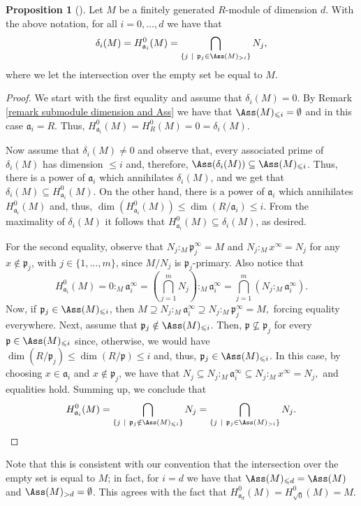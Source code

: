 \documentclass[12pt]{amsart}
\theoremstyle{definition}
\newtheorem{proposition}[theorem]{Proposition}
\theoremstyle{definition}
\def\frk{\mathfrak}               %
\def\aa{{\frk a}}
\def\pp{{\frk p}}
\renewcommand{\leq}{\leqslant}
\begin{document}
\begin{proposition}[{\cite[Proposition 2.2]{Sch99}}]\label{sche02}
  Let $M$ be a finitely generated $R$-module of dimension $d$. With the above notation, for all $i=0,\ldots,d$ we have that
 \[
 \delta_i(M) = H^0_{\aa_i}(M)=\bigcap\limits_{\{j \ \mid \ \pp_j\in\Ass(M)_{> i}\}} N_j,
 \]
 where we let the intersection over the empty set  be equal to $M$.
\end{proposition}
\begin{proof}
We start with the first equality and assume that $\delta_i(M)=0$. By Remark \ref{remark submodule dimension and Ass} we have that $\Ass(M)_{\leq i} = \emptyset$ and in this case  $\aa_i = R$. Thus,  $H^0_{\aa_i}(M) = H^0_R(M) = 0 = \delta_i(M)$.

\noindent
Now assume that $\delta_i(M) \ne 0$ and observe that,  every associated prime of $\delta_i(M)$ has dimension $\leq i$ and, therefore, $\Ass(\delta_i(M)) \subseteq \Ass(M)_{\leq i}$. Thus, there is a power of $\aa_i$ which annihilates $\delta_i(M)$, and we get that $\delta_i(M) \subseteq H^0_{\aa_i}(M)$. On the other hand, there is a power of $\aa_i$ which annihilates $H^0_{\aa_i}(M)$ and, thus, $\dim(H^0_{\aa_i}(M)) \leq \dim(R/\aa_i) \leq i$. From the maximality of $\delta_i(M)$ it follows that $H^0_{\aa_i}(M) \subseteq \delta_i(M)$, as desired. 

\smallskip
For the second equality, observe that $N_j:_M \pp_j^\infty =M$ and  $N_j:_M x^\infty =N_j$ for any $x \notin \pp_j$, with $j\in \{1,\ldots,m\}$, since $M/N_j$ is $\pp_j$-primary. Also notice that
\[
H^0_{\aa_i}(M) = 0:_M \aa_i^\infty = \left(\bigcap_{j=1}^m N_j\right):_M \aa_i^\infty = \bigcap_{j=1}^m (N_j:_M \aa_i^\infty).
\]
Now, if $\pp_j \in \Ass(M)_{\leq i}$, then 
$
M \supseteq N_j:_M \aa_i^\infty \supseteq N_j :_M \pp_j^\infty =M,
$
forcing equality everywhere. Next, assume that $\pp_j \notin \Ass(M)_{\leq i}$. Then, $\pp \not\subseteq \pp_j$ for every $\pp \in \Ass(M)_{\leq i}$ since, otherwise, we would have $\dim(R/\pp_j) \leq \dim(R/\pp) \leq i$ and, thus, $\pp_j \in \Ass(M)_{\leq i}$. In this case, by choosing  $x \in \aa_i$ and $x \notin \pp_j$, we have that $N_j \subseteq N_j:_M \aa_i^\infty \subseteq N_j:_M x^\infty = N_j,$
and equalities hold. Summing up, we conclude that
\[
H^0_{\aa_i}(M) = \bigcap_{\{j \ \mid \ \pp_j \notin \Ass(M)_{\leq i}\}} N_j = \bigcap_{\{j \ \mid \ \pp_j \in \Ass(M)_{>i}\}} N_j.  \qedhere
\]
\end{proof}

\noindent
Note that this is consistent with our convention that  the intersection over the empty set is equal to $M$; in fact, for $i=d$ we have that $\Ass(M)_{\leq d} =\Ass(M)$ and $\Ass(M)_{>d} = \emptyset$. This agrees with the fact that $H^0_{\aa_d}(M) = H^0_{\sqrt{0}}(M) = M$.
\end{document}
